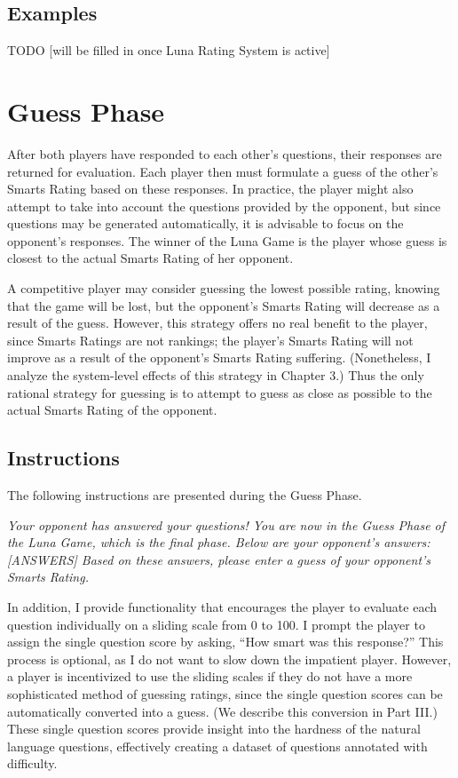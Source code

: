 \subsection{Examples}

TODO [will be filled in once Luna Rating System is active]

\section{Guess Phase}

After both players have responded to each other's questions, their responses are returned for evaluation. Each player then must formulate a guess of the other's Smarts Rating based on these responses. In practice, the player might also attempt to take into account the questions provided by the opponent, but since questions may be generated automatically, it is advisable to focus on the opponent's responses. The winner of the Luna Game is the player whose guess is closest to the actual Smarts Rating of her opponent.

A competitive player may consider guessing the lowest possible rating, knowing that the game will be lost, but the opponent's Smarts Rating will decrease as a result of the guess. However, this strategy offers no real benefit to the player, since Smarts Ratings are not rankings; the player's Smarts Rating will not improve as a result of the opponent's Smarts Rating suffering. (Nonetheless, I analyze the system-level effects of this strategy in Chapter 3.) Thus the only rational strategy for guessing is to attempt to guess as close as possible to the actual Smarts Rating of the opponent.

\subsection{Instructions}

The following instructions are presented during the Guess Phase.
\begin{center}
\textit{Your opponent has answered your questions! You are now in the Guess Phase of the Luna Game, which is the final phase. Below are your opponent's answers: [ANSWERS] Based on these answers, please enter a guess of your opponent's Smarts Rating.}
\end{center}
In addition, I provide functionality that encourages the player to evaluate each question individually on a sliding scale from 0 to 100. I prompt the player to assign the single question score by asking, ``How smart was this response?'' This process is optional, as I do not want to slow down the impatient player. However, a player is incentivized to use the sliding scales if they do not have a more sophisticated method of guessing ratings, since the single question scores can be automatically converted into a guess. (We describe this conversion in Part III.) These single question scores provide insight into the hardness of the natural language questions, effectively creating a dataset of questions annotated with difficulty.

